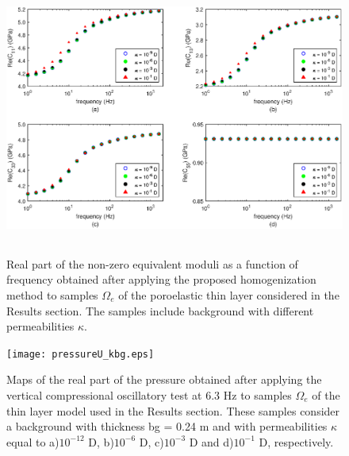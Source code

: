 \documentclass[draft]{agujournal2019}
\begin{document}
\begin{figure}[!ht]
\centering
        \includegraphics[width= 120mm, height=90mm]{cijkbg_2sandshaleU.eps}
\caption{Real part of the non-zero equivalent moduli as a function of frequency obtained after applying the proposed homogenization method to samples $\Omega_e$ of the poroelastic thin layer considered in the Results section. The samples include background with different permeabilities $\kappa$.}
\label{fig.11}
\end{figure}

\begin{figure}[!ht]
\centering
        \texttt{[image: pressureU\_kbg.eps]}
\caption{Maps of the real part of the pressure obtained after applying the vertical compressional oscillatory test at 6.3 Hz to samples $\Omega_e$ of the thin layer model used in the Results section. These samples consider a background with thickness bg = 0.24 m  and with permeabilities $\kappa$ equal to a)$10^{-12}$ D, b)$10^{-6}$ D, c)$10^{-3}$ D and d)$10^{-1}$ D, respectively. }
\label{fig.12}
\end{figure}
\end{document}
